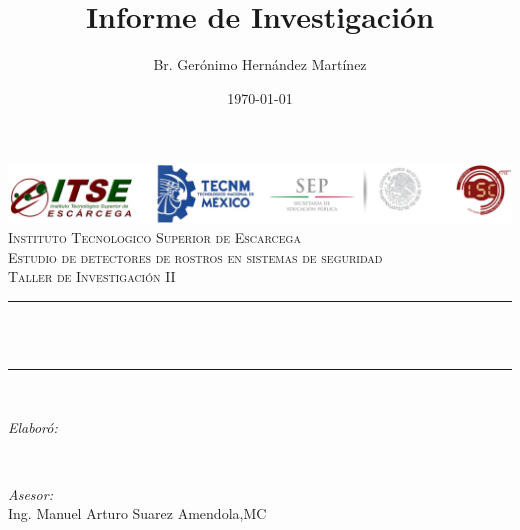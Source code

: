 \documentclass[12pt] {report}
\title{Informe de Investigación}
\author{Br. Gerónimo Hernández Martínez}
\date{\today}
\makeatletter
\let\thetitle\@title
\let\theauthor\@author
\let\thedate\@date
\makeatother
\begin{document}

\begin{titlepage}
	\centering
    \vspace*{0.2 cm}
    \includegraphics[scale = 0.60]{log1.png}\\[3.0 cm]
          \textsc{\LARGE Instituto Tecnologico Superior de Escarcega}\\[2.0 cm]	%
	\textsc{\Large Estudio de detectores de rostros en sistemas de seguridad}\\[0.5 cm]				
	\textsc{\large Taller de Investigación II}\\[0.5 cm]				
	\rule{\linewidth}{0.2 mm} \\[0.4 cm]
	{ \huge \bfseries \thetitle}\\
    
	\rule{\linewidth}{0.2 mm} \\[1.5 cm]
	
	\begin{minipage}{0.4\textwidth}
		\begin{flushleft} \large
			\emph{Elaboró:}\\
			\theauthor
			\end{flushleft}
			\end{minipage}~
			\begin{minipage}{0.4\textwidth}
			\begin{flushright} \large
			\emph{Asesor:} \\
			Ing. Manuel Arturo Suarez Amendola,MC	
           
		\end{flushright}
        
	\end{minipage}\\[2 cm]
	
	{\large \thedate}\\[5 cm]
 
	\vfill
	
\end{titlepage}


\tableofcontents
\pagebreak

\end{document}
